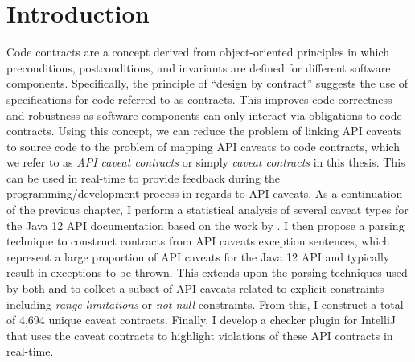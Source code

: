 \section{Introduction}
\label{sec:contract-intro}
Code contracts are a concept derived from object-oriented principles in which preconditions, postconditions, and invariants are defined for different software components. Specifically, the principle of ``design by contract'' suggests the use of specifications for code referred to as contracts. This improves code correctness and robustness as software components can only interact via obligations to code contracts. Using this concept, we can reduce the problem of linking API caveats to source code to the problem of mapping API caveats to code contracts, which we refer to as \textit{API caveat contracts} or simply \textit{caveat contracts} in this thesis. This can be used in real-time to provide feedback during the programming/development process in regards to API caveats. As a continuation of the previous chapter, I perform a statistical analysis of several caveat types for the Java 12 API documentation based on the work by \cite{zhou-directive}. I then propose a parsing technique to construct contracts from API caveats exception sentences, which represent a large proportion of API caveats for the Java 12 API and typically result in exceptions to be thrown. This extends upon the parsing techniques used by both \cite{zhou-directive} and \cite{blasi2018translating} to collect a subset of API caveats related to explicit constraints including \textit{range limitations} or \textit{not-null} constraints. From this, I construct a total of 4,694 unique caveat contracts. Finally, I develop a checker plugin for IntelliJ that uses the caveat contracts to highlight violations of these API contracts in real-time. \\

